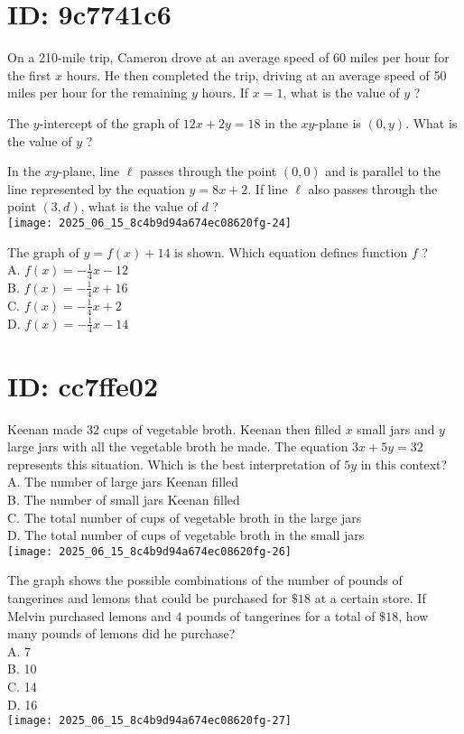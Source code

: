 
\section*{ID: 9c7741c6}
On a 210-mile trip, Cameron drove at an average speed of 60 miles per hour for the first $x$ hours. He then completed the trip, driving at an average speed of 50 miles per hour for the remaining $y$ hours. If $x=1$, what is the value of $y$ ?

The $y$-intercept of the graph of $12 x+2 y=18$ in the $x y$-plane is $(0, y)$. What is the value of $y$ ?

In the $x y$-plane, line $\ell$ passes through the point $(0,0)$ and is parallel to the line represented by the equation $y=8 x+2$. If line $\ell$ also passes through the point $(3, d)$, what is the value of $d$ ?\\
\texttt{[image: 2025\_06\_15\_8c4b9d94a674ec08620fg-24]}

The graph of $y=f(x)+14$ is shown. Which equation defines function $f$ ?\\
A. $f(x)=-\frac{1}{4} x-12$\\
B. $f(x)=-\frac{1}{4} x+16$\\
C. $f(x)=-\frac{1}{4} x+2$\\
D. $f(x)=-\frac{1}{4} x-14$

\section*{ID: cc7ffe02}
Keenan made 32 cups of vegetable broth. Keenan then filled $x$ small jars and $y$ large jars with all the vegetable broth he made. The equation $3 x+5 y=32$ represents this situation. Which is the best interpretation of $5 y$ in this context?\\
A. The number of large jars Keenan filled\\
B. The number of small jars Keenan filled\\
C. The total number of cups of vegetable broth in the large jars\\
D. The total number of cups of vegetable broth in the small jars\\
\texttt{[image: 2025\_06\_15\_8c4b9d94a674ec08620fg-26]}

The graph shows the possible combinations of the number of pounds of tangerines and lemons that could be purchased for $\$ 18$ at a certain store. If Melvin purchased lemons and 4 pounds of tangerines for a total of $\$ 18$, how many pounds of lemons did he purchase?\\
A. 7\\
B. 10\\
C. 14\\
D. 16\\
\texttt{[image: 2025\_06\_15\_8c4b9d94a674ec08620fg-27]}


